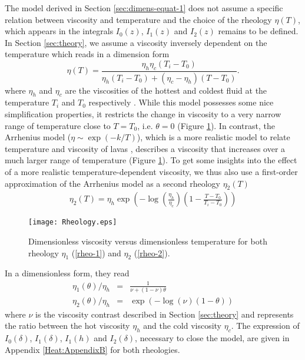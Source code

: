 The model derived in  Section \ref{sec:dimens-equat-1} does not assume
a specific relation  between viscosity and temperature  and the choice
of the  rheology $\eta(T)$, which  appears in the  integrals $I_0(z)$,
$I_1(z)$   and   $I_2(z)$   remains   to  be   defined.    In   Section
\ref{sec:theory},  we assume  a viscosity  inversely dependent  on the
temperature which reads in a dimension form
\begin{equation}
  \eta(T)=\frac{\eta_h
    \eta_c(T_i-T_0)}{\eta_h(T_i-T_0)+(\eta_c-\eta_h)(T-T_0)}.
\end{equation}
where $\eta_h$  and $\eta_c$  are the viscosities  of the  hottest and
coldest  fluid  at  the   temperature  $T_i$  and  $T_0$  respectively
\citep{Bercovici:2007vc}.   While  this   model  possesses  some  nice
simplification properties, it  restricts the change in  viscosity to a
very narrow  range of  temperature close  to $T=T_0$,  i.e. $\theta=0$
(Figure   \ref{C4-Rheology}).   In   contrast,  the   Arrhenius  model
($\eta \sim  \exp(-k/T)$), which is  a more realistic model  to relate
temperature and viscosity of lavas \citep{Blatt:2ViMWPc0}, describes a
viscosity  that increases  over  a much  larger  range of  temperature
(Figure \ref{C4-Rheology}).  To get some insights into the effect of a
more  realistic temperature-dependent  viscosity, we  thus also  use a
first-order approximation of the Arrhenius  model as a second rheology
$\eta_2(T)$ \citep{Diniega:2013eh}
\begin{eqnarray}
  \eta_2(T)                          =                          \eta_h
  \exp\left(-\log\left(\frac{\eta_h}{\eta_c}\right)\left(1-\frac{T-T_0}{T_i-T_0}\right)\right)
\end{eqnarray}
\begin{figure}[htbp]
  \begin{center}
    \graphicspath{ {/Users/thorey/Documents/These/Projet/Refroidissement/Skin_Model/Figure/Figure_Heating/} }
    \texttt{[image: Rheology.eps]}
    \caption{Dimensionless viscosity  versus dimensionless temperature
      for   both  rheology   $\eta_1$   (\ref{rheo-1})  and   $\eta_2$
      (\ref{rheo-2}).}
    \label{C4-Rheology}
  \end{center}
\end{figure}
In a dimensionless form, they read
\begin{eqnarray}
  \eta_1(\theta)/\eta_h&=&\frac{1}{\nu+(1-\nu)\theta} \label{rheo-1}\\
  \eta_2(\theta)/\eta_h&=&\exp\left(-\log(\nu)\left(1-\theta\right)\right)  \label{rheo-2}
\end{eqnarray}
where   $\nu$  is   the  viscosity   contrast  described   in  Section
\ref{sec:theory} and  represents the  ratio between the  hot viscosity
$\eta_h$  and   the  cold  viscosity  $\eta_c$.    The  expression  of
$I_0(\delta)$, $I_1(\delta)$, $I_1(h)$ and $I_2(\delta)$, necessary to
close the model,  are given in Appendix  \ref{Heat:AppendixB} for both
rheologies.

